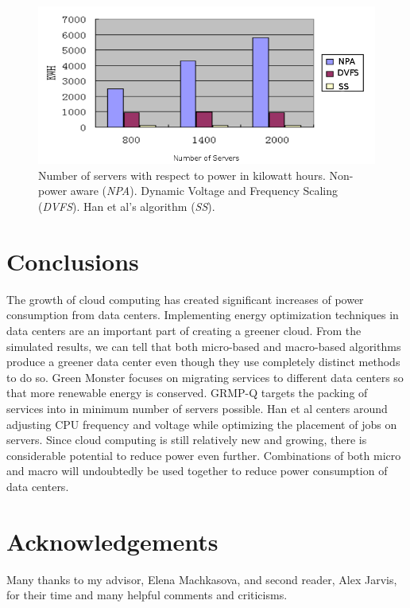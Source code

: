 \documentclass{sig-alternate}
\begin{document}

\begin{figure}[tb]
 \centering
 \includegraphics[height=0.24 \textwidth]{s4}
 \caption{Number of servers with respect to power in kilowatt hours. Non-power aware (\emph{NPA}). Dynamic Voltage and Frequency Scaling (\emph{DVFS}). Han et al's algorithm (\emph{SS}).}
 \label{fig:Results_SS}
\end{figure}

\section{Conclusions} 
\label{sec:conclusion}
The growth of cloud computing has created significant increases of power consumption from data centers. Implementing energy optimization techniques in data centers are an important part of creating a greener cloud. From the simulated results, we can tell that both micro-based and macro-based algorithms produce a greener data center even though they use completely distinct methods to do so. Green Monster focuses on migrating services to different data centers so that more renewable energy is conserved. GRMP-Q targets the packing of services into in minimum number of servers possible. Han et al centers around adjusting CPU frequency and voltage while optimizing the placement of jobs on servers. Since cloud computing is still relatively new and growing, there is considerable potential to reduce power even further. Combinations of both micro and macro will undoubtedly be used together to reduce power consumption of data centers.

\section*{Acknowledgements}

Many thanks to my advisor, Elena Machkasova, and second reader, Alex Jarvis, for their time and many helpful comments and criticisms. 



\end{document}
